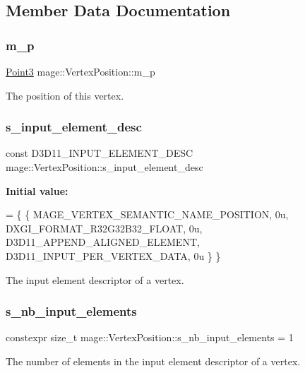 \subsection{Member Data Documentation}
\hypertarget{structmage_1_1_vertex_position_af752daea9af1272dba3d3da256e0aaa2}{}\label{structmage_1_1_vertex_position_af752daea9af1272dba3d3da256e0aaa2} 
\subsubsection{\texorpdfstring{m\+\_\+p}{m\_p}}
{\footnotesize\ttfamily \hyperlink{structmage_1_1_point3}{Point3} mage\+::\+Vertex\+Position\+::m\+\_\+p}

The position of this vertex. \hypertarget{structmage_1_1_vertex_position_a4e43cd06303beccd4791fdec9a13c47f}{}\label{structmage_1_1_vertex_position_a4e43cd06303beccd4791fdec9a13c47f} 
\subsubsection{\texorpdfstring{s\+\_\+input\+\_\+element\+\_\+desc}{s\_input\_element\_desc}}
{\footnotesize\ttfamily const D3\+D11\+\_\+\+I\+N\+P\+U\+T\+\_\+\+E\+L\+E\+M\+E\+N\+T\+\_\+\+D\+E\+SC mage\+::\+Vertex\+Position\+::s\+\_\+input\+\_\+element\+\_\+desc\hspace{0.3cm}{\ttfamily [static]}}

{\bfseries Initial value\+:}
\begin{DoxyCode}
= \{
        \{ MAGE\_VERTEX\_SEMANTIC\_NAME\_POSITION, 0u, DXGI\_FORMAT\_R32G32B32\_FLOAT,    0u, 
      D3D11\_APPEND\_ALIGNED\_ELEMENT, D3D11\_INPUT\_PER\_VERTEX\_DATA, 0u \}
    \}
\end{DoxyCode}
The input element descriptor of a vertex. \hypertarget{structmage_1_1_vertex_position_a250e2e24576b67c4970717a1419af9e2}{}\label{structmage_1_1_vertex_position_a250e2e24576b67c4970717a1419af9e2} 
\subsubsection{\texorpdfstring{s\+\_\+nb\+\_\+input\+\_\+elements}{s\_nb\_input\_elements}}
{\footnotesize\ttfamily constexpr size\+\_\+t mage\+::\+Vertex\+Position\+::s\+\_\+nb\+\_\+input\+\_\+elements = 1\hspace{0.3cm}{\ttfamily [static]}}

The number of elements in the input element descriptor of a vertex. 